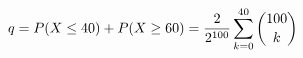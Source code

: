 \documentclass[preview]{standalone}
\begin{document}
\begin{align*}
\special{dvisvgm:raw <g id='unique000'>}q=P(X\le40)+P(X\ge60)=\frac{2}{2^{100}}\sum_{k=0}^{40}\binom{100}{k}\special{dvisvgm:raw </g>}
\end{align*}
\end{document}

